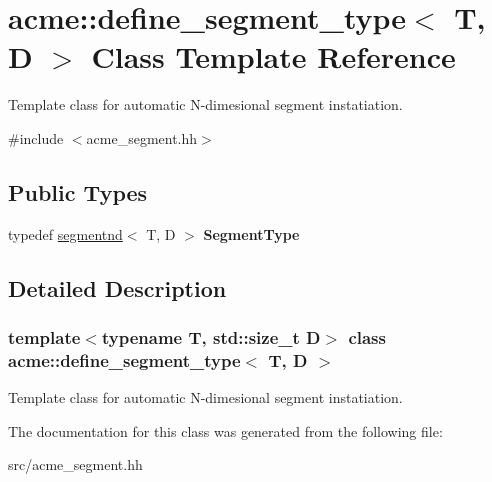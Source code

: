 \hypertarget{classacme_1_1define__segment__type}{}\section{acme\+:\+:define\+\_\+segment\+\_\+type$<$ T, D $>$ Class Template Reference}
\label{classacme_1_1define__segment__type}


Template class for automatic N-\/dimesional segment instatiation.  




{\ttfamily \#include $<$acme\+\_\+segment.\+hh$>$}

\subsection*{Public Types}
\begin{DoxyCompactItemize}
\item 
\mbox{\label{classacme_1_1define__segment__type_ada325a3c1eb86981d149a7424d407d0f}} 
typedef \hyperlink{classacme_1_1segmentnd}{segmentnd}$<$ T, D $>$ {\bfseries Segment\+Type}
\end{DoxyCompactItemize}


\subsection{Detailed Description}
\subsubsection*{template$<$typename T, std\+::size\+\_\+t D$>$\newline
class acme\+::define\+\_\+segment\+\_\+type$<$ T, D $>$}

Template class for automatic N-\/dimesional segment instatiation. 

The documentation for this class was generated from the following file\+:\begin{DoxyCompactItemize}
\item 
src/acme\+\_\+segment.\+hh\end{DoxyCompactItemize}

